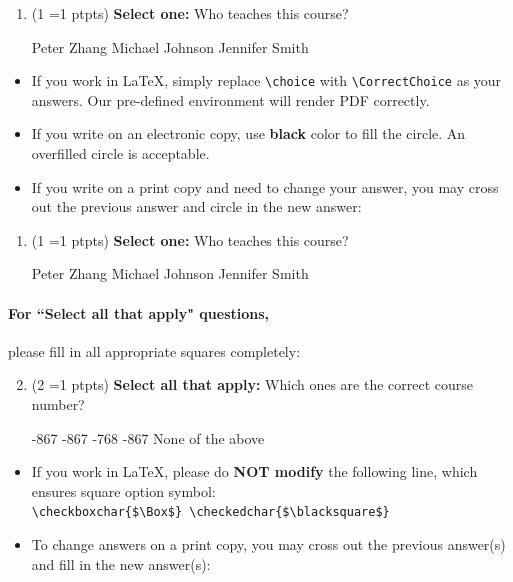 \documentclass[11pt, letter, answers]{exam}
\newcommand{\pt}[1]{
    \small{(#1 \ifnum#1=1 pt\else pts\fi)}
    \normalsize
}
\newcommand{\sOne}{\textbf{Select one: }}
\newcommand{\sAll}{\textbf{Select all that apply: }}
\newcommand{\blackcircle}{\tikz\draw[black,fill=black] (0,0) circle (1ex);}
\begin{document}
\begin{enumerate}
\item \pt{1} \sOne Who teaches this course?
\begin{checkboxes}
    \CorrectChoice Peter Zhang
    \choice Michael Johnson
    \choice Jennifer Smith
\end{checkboxes}
\end{enumerate}

\begin{itemize}[topsep=0.5em]
\item If you work in \LaTeX{}, simply replace \texttt{\textbackslash choice} with \texttt{\textbackslash CorrectChoice} as your answers. Our pre-defined environment will render PDF correctly.
\item If you write on an electronic copy, use \textbf{black} color to fill the circle. An overfilled circle is acceptable.
\item If you write on a print copy and need to change your answer, you may cross out the previous answer and circle in the new answer:
\end{itemize}

\begin{enumerate}[label={}]
\item \pt{1} \sOne Who teaches this course?
\begin{checkboxes}
    \CorrectChoice Peter Zhang
    \choice Michael Johnson
    \checkboxchar{\xcancel{$\blackcircle$}{}} \choice Jennifer Smith
\end{checkboxes}
\end{enumerate}


\paragraph{For ``Select all that apply" questions,} please fill in all appropriate squares completely:

\begin{enumerate}
\setcounter{enumi}{1}
\item \pt{2} \sAll Which ones are the correct course number?
{
\checkboxchar{$\Box$} \checkedchar{$\blacksquare$}
\begin{checkboxes}
    -867
    -867
    -768
    -867
    \choice None of the above
\end{checkboxes}
}
\end{enumerate}

\begin{itemize}[topsep=0.5em]
\item If you work in \LaTeX, please do \textbf{NOT modify} the following line, which ensures square option symbol:\\
\verb|\checkboxchar{$\Box$} \checkedchar{$\blacksquare$}|
\item To change answers on a print copy, you may cross out the previous answer(s) and fill in the new answer(s):
\end{itemize}
\end{document}
